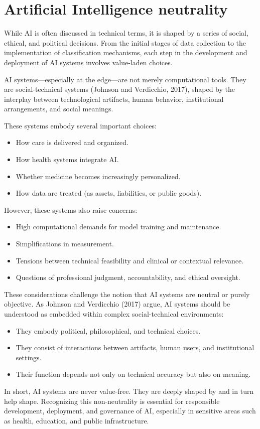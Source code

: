 \section{Artificial Intelligence neutrality}

While AI is often discussed in technical terms, it is shaped by a series of social, ethical, and political decisions. 
From the initial stages of data collection to the implementation of classification mechanisms, each step in the development and deployment of AI systems involves value-laden choices.

AI systems—especially at the edge—are not merely computational tools. 
They are social-technical systems (Johnson and Verdicchio, 2017), shaped by the interplay between technological artifacts, human behavior, institutional arrangements, and social meanings.

These systems embody several important choices:
\begin{itemize}
   \item How care is delivered and organized.
   \item How health systems integrate AI.
   \item Whether medicine becomes increasingly personalized.
   \item How data are treated (as assets, liabilities, or public goods).
\end{itemize}
\noindent However, these systems also raise concerns:
\begin{itemize}
    \item High computational demands for model training and maintenance.
    \item Simplifications in measurement.
    \item Tensions between technical feasibility and clinical or contextual relevance.
    \item Questions of professional judgment, accountability, and ethical oversight.
\end{itemize}

These considerations challenge the notion that AI systems are neutral or purely objective. 
As Johnson and Verdicchio (2017) argue, AI systems should be understood as embedded within complex social-technical environments:
\begin{itemize}
    \item They embody political, philosophical, and technical choices.
    \item They consist of interactions between artifacts, human users, and institutional settings.
    \item Their function depends not only on technical accuracy but also on meaning.
\end{itemize}
\noindent In short, AI systems are never value-free. 
They are deeply shaped by and in turn help shape. 
Recognizing this non-neutrality is essential for responsible development, deployment, and governance of AI, especially in sensitive areas such as health, education, and public infrastructure.